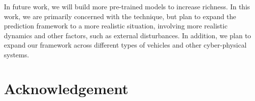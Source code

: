 \documentclass[letterpaper, 10 pt, conference]{ieeeconf}  %
\newcommand\NB[1]{$\spadesuit$\footnote{NB: #1}}
\begin{document}
In future work, we will build more pre-trained models to increase richness. In this work, we are primarily concerned with the technique, but plan to expand the prediction framework to a more realistic situation, involving more realistic dynamics and other factors, such as external disturbances. In addition, we plan to expand our framework across different types of vehicles and other cyber-physical systems.

\section{Acknowledgement}


%
%
%


  
  

%




\end{document}
